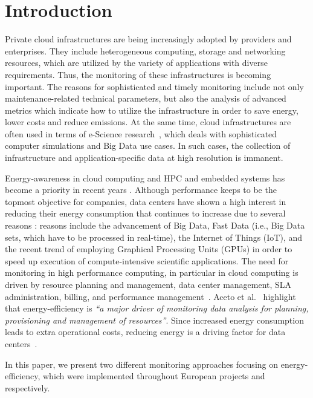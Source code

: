 \documentclass[10pt,letterpaper]{IEEEtran}
\begin{document}
 \section{Introduction}
\label{sec:intro}

\noindent
Private cloud infrastructures are being increasingly adopted by providers and enterprises.
They include heterogeneous computing, storage and networking resources, which are utilized
by the variety of applications with diverse requirements. Thus, the monitoring of
these infrastructures is becoming important. The reasons for sophisticated and timely
monitoring include not only maintenance-related technical parameters, but also
the analysis of advanced metrics which indicate how to utilize the infrastructure in order to
save energy, lower costs and reduce emissions. At the same time, cloud infrastructures are often used
in terms of e-Science research~\cite{gray2007}, which deals with
sophisticated computer simulations and Big Data use cases. In such cases, the collection
of infrastructure and application-specific data at high resolution is immanent.

Energy-awareness in cloud computing and HPC and embedded systems has become a priority in
recent years \cite{Valentini13}. Although performance keeps to be the topmost objective for companies,
data centers have shown a high interest in reducing their energy consumption
that continues to increase due to several reasons \cite{basmadjian12,liu09,obaidat12}: reasons include the advancement
of Big Data, Fast Data (i.e., Big Data sets, which have to be processed in real-time), the Internet of Things (IoT),
and the recent trend of employing Graphical
Processing Units (GPUs) in order to speed up execution of compute-intensive scientific applications. 
The need for monitoring in high performance computing, in particular in cloud computing is driven by resource planning
and management, data center management, SLA administration, billing, and performance management~\cite{aceto13}.
Aceto et al.~\cite{aceto13} highlight that energy-efficiency is \emph{``a major driver of monitoring data analysis for planning,
provisioning and management of resources''}.
Since increased energy consumption leads to extra operational costs, reducing energy is a driving factor for
data centers~\cite{Valentini13}. 

In this paper, we present two different monitoring approaches focusing
on energy-efficiency, which were
implemented throughout European projects \ECO and \EXCESS respectively.
\end{document}
